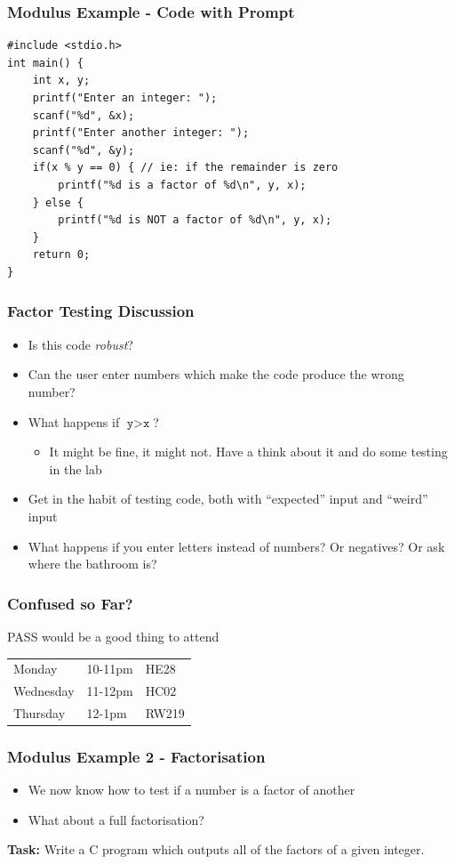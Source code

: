 \documentclass[14pt]{beamer}
\begin{document}
\begin{frame}[fragile]
\frametitle{Modulus Example - Code with Prompt}
\begin{lstlisting}[style=CStyle,caption=\texttt{factorTest.c}]
#include <stdio.h>
int main() {
	int x, y;
	printf("Enter an integer: ");
	scanf("%d", &x);
	printf("Enter another integer: ");
	scanf("%d", &y);
	if(x % y == 0) { // ie: if the remainder is zero
		printf("%d is a factor of %d\n", y, x);
	} else {
		printf("%d is NOT a factor of %d\n", y, x);
	}
	return 0;
}
\end{lstlisting}
\end{frame}

\begin{frame}
\frametitle{Factor Testing Discussion}
\begin{itemize}
\item Is this code \textit{robust}?
\item Can the user enter numbers which make the code produce the wrong number?
\item What happens if $\texttt{y}>\texttt{x}$?
	\begin{itemize}
		\item It might be fine, it might not. Have a think about it and do some testing in the lab
	\end{itemize}
\item Get in the habit of testing code, both with ``expected'' input and ``weird'' input
\item What happens if you enter letters instead of numbers? Or negatives? Or ask where the bathroom is?
\end{itemize}
\end{frame}

\begin{frame}
\frametitle{Confused so Far?}
\begin{center}
\huge{PASS would be a good thing to attend}
\end{center}
\begin{table}[]
\begin{tabular}{lll}
Monday    & 10-11pm    & HE28  \\
Wednesday & 11-12pm & HC02  \\
Thursday  & 12-1pm  & RW219
\end{tabular}
\end{table}
\end{frame}

\begin{frame}
\frametitle{Modulus Example 2 - Factorisation}
\begin{itemize}
\item We now know how to test if a number is a factor of another
\item What about a full factorisation?
\end{itemize}

\textbf{Task:} Write a C program which outputs all of the factors of a given integer.
\end{frame}
\end{document}
